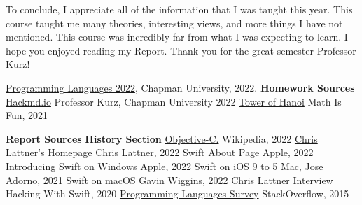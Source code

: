 \documentclass{article}
\theoremstyle{theorem}
\theoremstyle{definition}
\theoremstyle{remark}
\begin{document}
\noindent\newline To conclude, I appreciate all of the information that I was taught this year. This course taught me many theories, interesting views, and more things I have not mentioned. This course was incredibly far from what I was expecting to learn. I hope you enjoyed reading my Report. Thank you for the great semester Professor Kurz!

\begin{thebibliography}{99}

 \href{https://github.com/alexhkurz/programming-languages-2022/blob/main/README.md}{Programming Languages 2022}, Chapman University, 2022.\newline
\newline
\textbf{Homework Sources} \newline
\href{https://hackmd.io/@alexhkurz/H1jUka4Gv#fn2}{Hackmd.io} Professor Kurz, Chapman University 2022\newline\newline
\href{https://www.mathsisfun.com/games/towerofhanoi.html}{Tower of Hanoi} Math Is Fun, 2021 \newline

\textbf{Report Sources}\newline
\textbf{History Section}\newline
\href{https://en.wikipedia.org/wiki/Objective-C#:~:text=10%20External%20links-,History,Programming%20Technology%20Center%20in%201981.}{Objective-C.} Wikipedia, 2022\newline
\href{https://nondot.org/~sabre/}{Chris Lattner's Homepage} Chris Lattner, 2022\newline
\href{https://www.swift.org/about/}{Swift About Page} Apple, 2022\newline
\href{https://www.swift.org/blog/swift-on-windows/}{Introducing Swift on Windows} Apple, 2022\newline
\href{https://9to5mac.com/2021/12/15/apple-releases-long-awaited-swift-playgrounds-update-with-the-ability-to-create-apps-using-ipad/}{Swift on iOS} 9 to 5 Mac, Jose Adorno, 2021 \newline
\href{https://gavinw.me/swift-macos/}{Swift on macOS} Gavin Wiggins, 2022 \newline
\href{https://www.hackingwithswift.com/interviews/chris-lattner-how-did-you-start-creating-swift}{Chris Lattner Interview} Hacking With Swift, 2020\newline
\href{https://stackoverflow.blog/2015/04/07/stack-overflow-developer-survey-2015-the-results/}{Programming Languages Survey} StackOverflow, 2015\newline


\end{thebibliography}
\end{document}
